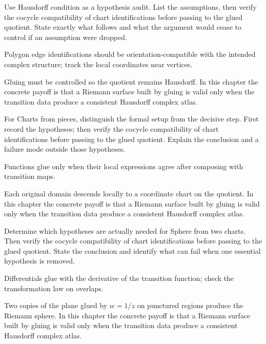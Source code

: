 \begin{exercise}\label{exr:iv25-04}
Use Hausdorff condition as a hypothesis audit. List the assumptions, then verify the cocycle compatibility of chart identifications before passing to the glued quotient. State exactly what follows and what the argument would cease to control if an assumption were dropped.
\end{exercise}
\begin{hint}
Polygon edge identifications should be orientation-compatible with the intended complex structure; track the local coordinates near vertices.
\end{hint}
\begin{solution}
Gluing must be controlled so the quotient remains Hausdorff. In this chapter the concrete payoff is that a Riemann surface built by gluing is valid only when the transition data produce a consistent Hausdorff complex atlas.
\end{solution}

\begin{exercise}\label{exr:iv25-05}
For Charts from pieces, distinguish the formal setup from the decisive step. First record the hypotheses; then verify the cocycle compatibility of chart identifications before passing to the glued quotient. Explain the conclusion and a failure mode outside those hypotheses.
\end{exercise}
\begin{hint}
Functions glue only when their local expressions agree after composing with transition maps.
\end{hint}
\begin{solution}
Each original domain descends locally to a coordinate chart on the quotient. In this chapter the concrete payoff is that a Riemann surface built by gluing is valid only when the transition data produce a consistent Hausdorff complex atlas.
\end{solution}

\begin{exercise}\label{exr:iv25-06}
Determine which hypotheses are actually needed for Sphere from two charts. Then verify the cocycle compatibility of chart identifications before passing to the glued quotient. State the conclusion and identify what can fail when one essential hypothesis is removed.
\end{exercise}
\begin{hint}
Differentials glue with the derivative of the transition function; check the transformation law on overlaps.
\end{hint}
\begin{solution}
Two copies of the plane glued by $w=1/z$ on punctured regions produce the Riemann sphere. In this chapter the concrete payoff is that a Riemann surface built by gluing is valid only when the transition data produce a consistent Hausdorff complex atlas.
\end{solution}

